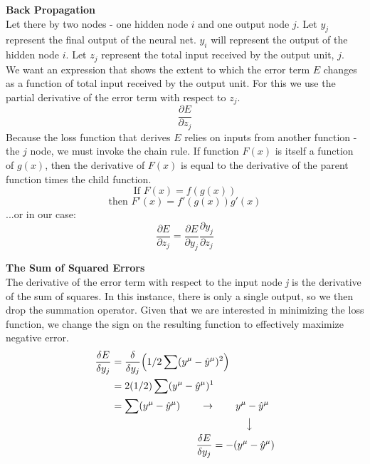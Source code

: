 \documentclass[]{article}
\begin{document}
\newpage
\noindent\textbf{Back Propagation}\\
\indent Let there by two nodes - one hidden node $i$ and one output node $j$. Let $y_j$ represent the final output of the neural net. $y_i$ will represent the output of the hidden node $i$. Let $z_j$ represent the total input received by the output unit, $j$.\\
\indent We want an expression that shows the extent to which the error term $E$ changes as a function of total input received by the output unit. For this we use the partial derivative of the error term with respect to $z_j$.
\[\displaystyle\frac{\partial E}{\partial z_j} \]
Because the loss function that derives $E$ relies on inputs from another function - the $j$ node, we must invoke the chain rule. If function $F(x)$ is itself a function of $g(x)$, then the derivative of $F(x)$ is equal to the derivative of the parent function times the child function.
\[\text{If }F(x) = f(g(x)) \] 
\[\text{then }F'(x) = f'(g(x))g'(x) \] 
...or in our case:
\[\displaystyle\frac{\partial E}{\partial z_j}  = \displaystyle\frac{\partial E}{\partial y_j}\displaystyle\frac{\partial y_j}{\partial z_j}\]


\noindent\textbf{The Sum of Squared Errors}\\
The derivative of the error term with respect to the input node \textit{j} is the derivative of the sum of squares. In this instance, there is only a single output, so we then drop the summation operator. Given that we are interested in minimizing the loss function, we change the sign on the resulting function to effectively maximize negative error. 
\begin{equation} \label{eq1}
\begin{split}
\displaystyle\frac{\delta E}{\delta y_j} & = \displaystyle\frac{\delta}{\delta y_j}\Big(1/2\sum(y^\mu - \hat{y}^\mu)^2\Big)\\
& = 2(1/2)\sum(y^\mu - \hat{y}^\mu)^1\\
& = \sum(y^\mu - \hat{y}^\mu) \text{\phantom{aaaa}} \rightarrow \text{\phantom{aaaa}} y^\mu - \hat{y}^\mu \\
& \text{\phantom{aaaaaaaaaaaaaaaaaaaaaaaaaaa}} \big\downarrow\\
& \text{\phantom{aaaaaaaaaaaaaaaaa}} \displaystyle\frac{\delta E}{\delta y_j} = -(y^\mu - \hat{y}^\mu)
\end{split}
\end{equation}
\end{document}
